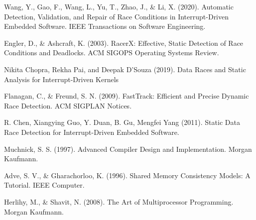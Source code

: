 \documentclass[
fancyheadings, %
%
%
]{stsreprt}
\begin{document}
	\backmatter{}
	\begin{thebibliography}{9}
		Wang, Y., Gao, F., Wang, L., Yu, T., Zhao, J., \& Li, X. (2020). Automatic Detection, Validation, and Repair of Race Conditions in Interrupt-Driven Embedded Software. IEEE Transactions on Software Engineering.
		
		Engler, D., \& Ashcraft, K. (2003). RacerX: Effective, Static Detection of Race Conditions and Deadlocks. ACM SIGOPS Operating Systems Review.
		
		Nikita Chopra, Rekha Pai, and Deepak D’Souza (2019). Data Races and Static Analysis for Interrupt-Driven Kernels
		
		Flanagan, C., \& Freund, S. N. (2009). FastTrack: Efficient and Precise Dynamic Race Detection. ACM SIGPLAN Notices.
		
		R. Chen, Xiangying Guo, Y. Duan, B. Gu, Mengfei Yang (2011). Static Data Race Detection for Interrupt-Driven Embedded Software.
		
		Muchnick, S. S. (1997). Advanced Compiler Design and Implementation. Morgan Kaufmann.
		
		Adve, S. V., \& Gharachorloo, K. (1996). Shared Memory Consistency Models: A Tutorial. IEEE Computer.
		
		Herlihy, M., \& Shavit, N. (2008). The Art of Multiprocessor Programming. Morgan Kaufmann.
	\end{thebibliography}
\end{document}
